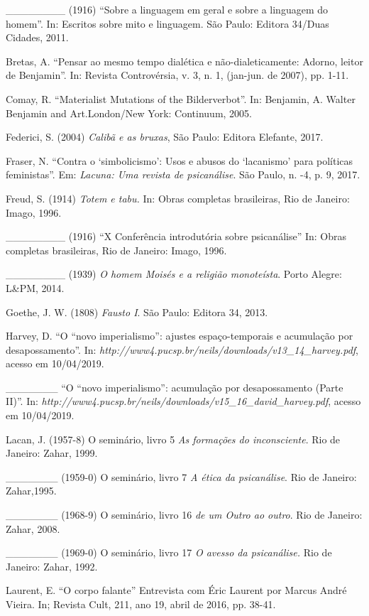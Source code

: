 \_\_\_\_\_\_\_\_ (1916) ``Sobre a linguagem em geral e sobre a linguagem
do homem''. In: Escritos sobre mito e linguagem. São Paulo: Editora
34/Duas Cidades, 2011.

Bretas, A. ``Pensar ao mesmo tempo dialética e não-dialeticamente:
Adorno, leitor de Benjamin''. In: Revista Controvérsia, v. 3, n. 1,
(jan-jun. de 2007), pp. 1-11.

Comay, R. ``Materialist Mutations of the Bilderverbot''. In: Benjamin,
A. Walter Benjamin and Art.London/New York: Continuum, 2005.

Federici, S. (2004) \emph{Calibã e as bruxas}, São Paulo: Editora
Elefante, 2017.

Fraser, N. ``Contra o `simbolicismo': Usos e abusos do `lacanismo' para
políticas feministas''. Em: \emph{Lacuna: Uma revista de psicanálise}.
São Paulo, n. -4, p. 9, 2017.

Freud, S. (1914) \emph{Totem e tabu.} In: Obras completas brasileiras,
Rio de Janeiro: Imago, 1996.

\_\_\_\_\_\_\_\_ (1916) ``X Conferência introdutória sobre psicanálise''
In: Obras completas brasileiras, Rio de Janeiro: Imago, 1996.

\_\_\_\_\_\_\_\_ (1939) \emph{O homem Moisés e a religião monoteísta}.
Porto Alegre: L\&PM, 2014.

Goethe, J. W. (1808) \emph{Fausto I}. São Paulo: Editora 34, 2013.

Harvey, D. ``O ``novo imperialismo'': ajustes espaço-temporais e
acumulação por desapossamento''. In:
\emph{http://www4.pucsp.br/neils/downloads/v13\_14\_harvey.pdf},
acesso em 10/04/2019.

\_\_\_\_\_\_\_ ``O ``novo imperialismo'': acumulação por desapossamento
(Parte II)''. In:
\emph{http://www4.pucsp.br/neils/downloads/v15\_16\_david\_harvey.pdf},
acesso em 10/04/2019.

Lacan, J. (1957-8) O seminário, livro 5 \emph{As formações do
inconsciente}. Rio de Janeiro: Zahar, 1999.

\_\_\_\_\_\_\_ (1959-0) O seminário, livro 7 \emph{A ética da
psicanálise}. Rio de Janeiro: Zahar,1995.

\_\_\_\_\_\_\_ (1968-9) O seminário, livro 16 \emph{de um Outro ao
outro}. Rio de Janeiro: Zahar, 2008.

\_\_\_\_\_\_\_ (1969-0) O seminário, livro 17 \emph{O avesso da
psicanálise.} Rio de Janeiro: Zahar, 1992.

Laurent, E. ``O corpo falante'' Entrevista com Éric Laurent por Marcus
André Vieira. In; Revista Cult, 211, ano 19, abril de 2016, pp. 38-41.

